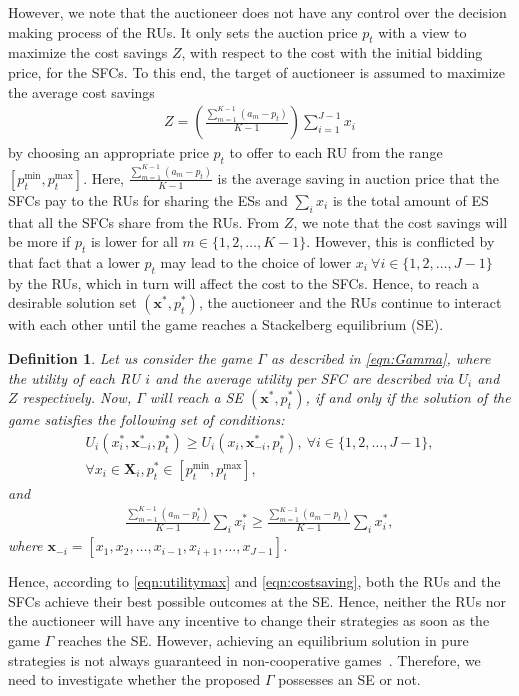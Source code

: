 \documentclass[journal,10pt]{IEEEtran}
\newtheorem{definition}{\bf Definition}
\begin{document}
However, we note that the auctioneer does not have any control over the decision making process of the RUs. It only sets the auction price $p_t$ with a view to maximize the cost savings $Z$, with respect to the cost with the initial bidding price, for the SFCs. To this end, the target of auctioneer is assumed to maximize the average cost savings
\begin{eqnarray}
Z=\left(\frac{\sum_{m=1}^{K-1}(a_m-p_t)}{K-1}\right)\sum_{i=1}^{J-1} x_i\label{eqn:cost-savings}
\end{eqnarray}
by choosing an appropriate price $p_t$ to offer to each RU from the range $[p_t^\text{min}, p_t^\text{max}]$. Here, $\frac{\sum_{m=1}^{K-1}(a_m-p_t)}{K-1}$ is the average saving in auction price that the SFCs pay to the RUs for sharing the ESs and $\sum_i x_i$ is the total amount of ES that all the SFCs share from the RUs. From $Z$, we note that the cost savings will be more if $p_t$ is lower for all $m\in\{1,2,\hdots,K-1\}$. However, this is conflicted by that fact that a lower $p_t$ may lead to the choice of lower $x_i~\forall i\in\{1,2,\hdots,J-1\}$ by the RUs, which in turn will affect the cost to the SFCs. Hence, to reach a desirable solution set $(\mathbf{x}^*,p_t^*)$, the auctioneer and the RUs continue to interact with each other until the game reaches a Stackelberg equilibrium (SE).
\begin{definition}
Let us consider the game $\Gamma$ as described in \eqref{eqn:Gamma}, where the utility of each RU $i$ and the average utility per SFC are described via $U_i$ and $Z$ respectively. Now, $\Gamma$ will reach a SE $(\mathbf{x}^*,p_t^*)$, if and only if the solution of the game satisfies the following set of conditions:
\begin{eqnarray}
U_i(x_i^*, \mathbf{x}_{-i}^*,p_t^*)\geq U_i(x_i, \mathbf{x}_{-i}^*,p_t^*),\label{eqn:utilitymax}~\forall i\in\{1,2,\hdots,J-1\},\nonumber\\\forall x_i\in\mathbf{X}_i, p_t^*\in[p_t^\text{min}, p_t^\text{max}],
\end{eqnarray}
and
\begin{eqnarray}
\frac{\sum_{m=1}^{K-1}(a_m-p_t^*)}{K-1}\sum_i x_i^*\geq \frac{\sum_{m=1}^{K-1}(a_m-p_t)}{K-1}\sum_i x_i^*,
\label{eqn:costsaving}
\end{eqnarray}
where $\mathbf{x}_{-i} = \left[x_1, x_2,\hdots, x_{i-1}, x_{i+1}, \hdots, x_{J-1}\right]$.
\end{definition}
Hence, according to \eqref{eqn:utilitymax} and \eqref{eqn:costsaving}, both the RUs and the SFCs achieve their best possible outcomes at the SE. Hence, neither the RUs nor the auctioneer will have any incentive to change their strategies as soon as the game $\Gamma$ reaches the SE. However, achieving an equilibrium solution in pure strategies is not always guaranteed in non-cooperative games~\cite{Wayes-J-TSG:2012}. Therefore, we need to investigate whether the proposed $\Gamma$ possesses an SE or not.
\end{document}
